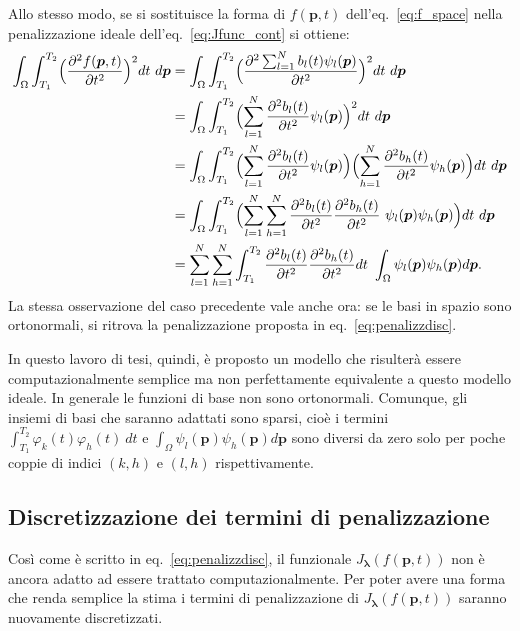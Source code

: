 \documentclass[a4paper,11pt,twoside,openright]{book}							%
\begin{document}
Allo stesso modo, se si sostituisce la forma di $f(\bm p,t)$ dell'eq.~\eqref{eq:f_space} nella penalizzazione ideale dell'eq.~\eqref{eq:Jfunc_cont} si ottiene:
\begin{equation} 
\label{eq:espansione_funzinf_sp}
\begin{split}
\int_\Omega \int_{T_1}^{T_2} \Bigl( \frac{\partial^2 f(\bm p, t) }{\partial t ^2} \Bigr)^2 dt\ d\bm p 
&=\int_\Omega \int_{T_1}^{T_2} \Bigl( \frac{\partial^2 \sum_{l=1}^N b_l(t)\psi_l(\bm p) }{\partial t ^2} \Bigr)^2 dt\ d\bm p \\
&=\int_\Omega \int_{T_1}^{T_2} \Bigl( \sum_{l=1}^N \frac{ \partial^2b_l(t)}{\partial t ^2}\psi_l(\bm p)  \Bigr)^2 dt\ d\bm p  \\
&=\int_\Omega \int_{T_1}^{T_2} \Bigl( \sum_{l=1}^N \frac{ \partial^2b_l(t)}{\partial t ^2}\psi_l(\bm p)  \Bigr)\Bigl( \sum_{h=1}^N \frac{ \partial^2b_h(t)}{\partial t ^2}\psi_h(\bm p)  \Bigr) dt\ d\bm p \\
&= \int_\Omega \int_{T_1}^{T_2} \Bigl( \sum_{l=1}^N \sum_{h=1}^N \frac{ \partial^2b_l(t)}{\partial t ^2}\frac{ \partial^2b_h(t)}{\partial t ^2}\   \psi_l(\bm p)  \psi_h(\bm p)  \Bigr) dt\ d\bm p \\
&=\sum_{l=1}^N \sum_{h=1}^N  \int_{T_1}^{T_2}  \frac{ \partial^2b_l(t)}{\partial t ^2}\frac{ \partial^2b_h(t)}{\partial t ^2}dt\  \int_\Omega \psi_l(\bm p)  \psi_h(\bm p)    d\bm p .
\end{split}
\end{equation}
La stessa osservazione del caso precedente vale anche ora: se le basi in spazio sono ortonormali, si ritrova la penalizzazione proposta in eq.~\eqref{eq:penalizzdisc}. 

In questo lavoro di tesi, quindi, è proposto un modello che risulterà essere computazionalmente semplice ma non perfettamente equivalente a questo modello ideale. In generale le funzioni di base non sono ortonormali. Comunque, gli insiemi di basi che saranno adattati sono sparsi, cioè i termini $ \int_{T_1}^{T_2} \varphi_k(t)\varphi_h(t)\ dt $ e $\int_\Omega \psi_l(\bm p)  \psi_h(\bm p)d\bm p$ sono diversi da zero solo per poche coppie di indici $(k,h)$ e $(l,h)$ rispettivamente.



\subsection{Discretizzazione dei termini di penalizzazione}
Così come è scritto in eq.~\eqref{eq:penalizzdisc}, il funzionale $J_{\bm \lambda }(f(\bm{p},t))$ non è ancora adatto ad essere trattato computazionalmente. Per poter avere una forma che renda semplice la stima i termini di penalizzazione di $J_{\bm \lambda }(f(\bm{p},t))$ saranno nuovamente discretizzati. 
\end{document}

